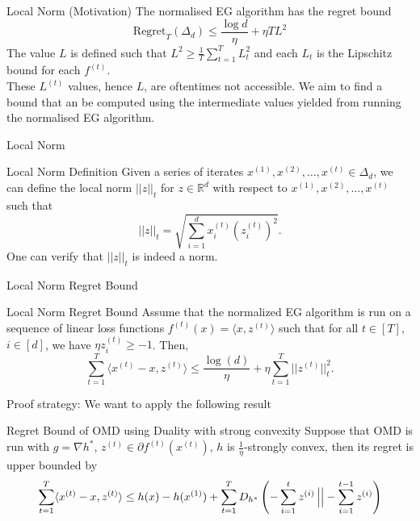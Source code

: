 \begin{frame}{Local Norm (Motivation)}
    The normalised EG algorithm has the regret bound
    $$
    \boxed{\text{Regret}_T(\Delta_d) \leq \frac{\log d}{\eta} + \eta TL^2}
    $$\pause
    The value $L$ is defined such that $L^2 \geq \frac{1}{T}\sum_{t=1}^T L_t^2$ and each $L_t$ is the Lipschitz bound for each $f^{(t)}$. \\ \pause
    These $L^{(t)}$ values, hence $L$, are oftentimes not accessible. We aim to find a bound that an be computed using the intermediate values yielded from running the normalised EG algorithm.
\end{frame}

\begin{frame}{Local Norm}
    \begin{block}{Local Norm Definition}
    Given a series of iterates $x^{(1)}, x^{(2)}, \dots, x^{(t)} \in \Delta_d$, we can define the local norm $||z||_t$ for $z \in \mathbb{R}^d$ with respect to $x^{(1)}, x^{(2)}, \dots, x^{(t)}$ such that 
    $$||z||_t = \sqrt{\sum_{i=1}^d x^{(t)}_i (z^{(t)}_i)^2}.$$
    One can verify that $||z||_t$ is indeed a norm.
\end{block}
\end{frame}

\begin{frame}{Local Norm Regret Bound}
    \small
    \begin{block}{Local Norm Regret Bound}
    Assume that the normalized EG algorithm is run on a sequence of linear loss functions $f^{(t)}(x) = \langle x, z^{(t)} \rangle$ such that for all $t \in [T]$, $i \in [d]$, we have $\eta z^{(t)}_i \geq -1$. Then,
    $$
    \sum_{t=1}^T \langle x^{(t)} - x, z^{(t)} \rangle
    \leq \frac{\log(d)}{\eta} + \eta \sum_{t=1}^T ||z^{(t)}||^2_t.
    $$
    \end{block}\pause
    Proof strategy: We want to apply the following result
    \begin{block}{Regret Bound of OMD using Duality with strong convexity}
        Suppose that OMD is run with $g = \nabla h^*$, $z^{(t)} \in \partial f^{(t)}(x^{(t)})$, $h$ is $\frac{1}{\eta}$-strongly convex, then its regret is upper bounded by
        $$
        \sum_{t=1}^T\langle x^{(t)} - x, z^{(t)} \rangle \leq h(x) - h(x^{(1)}) + \sum_{t=1}^T D_{h^*}\left(-\sum_{i=1}^t z^{(i)} \left\vert \vphantom{\frac{a}{b}} \right\vert  -\sum_{i=1}^{t-1}z^{(i)}\right)
        $$
    \end{block}
\end{frame}

